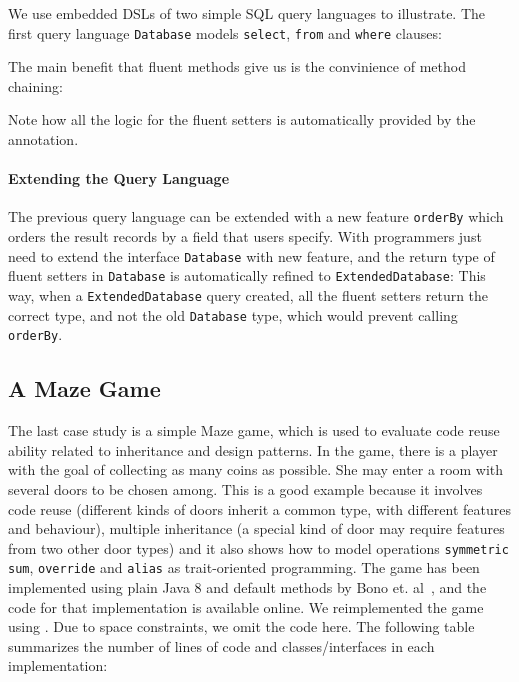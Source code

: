 \noindent We use embedded DSLs of two simple SQL query languages to illustrate.
The first query language \texttt{Database}  models
\texttt{select}, \texttt{from} and \texttt{where} clauses:

\noindent The main benefit that fluent methods give
us is the convinience of method chaining:


\noindent Note how all the logic for the fluent setters is automatically provided by the \mixin annotation. 

\paragraph{Extending the Query Language} The previous query language can be extended with a new feature
\texttt{orderBy} which orders the result records by a field that users
specify. With \mixin programmers just need to extend the interface \texttt{Database} with new
feature, and the return type of fluent setters in
\texttt{Database} is automatically refined to \texttt{ExtendedDatabase}:
This way, when a \texttt{ExtendedDatabase} query created, 
all the fluent setters return the correct type, and not the old \texttt{Database} type, which would prevent calling 
\texttt{orderBy}.


\subsection{A Maze Game}
The last case study is a simple Maze game, which is used
to evaluate code reuse ability related to inheritance and design
patterns. In the game, there is a player with the goal of collecting
as many coins as possible. She may enter a room with several doors to
be chosen among. This is a good example because it involves code reuse
(different kinds of doors inherit a common type, with different
features and behaviour), multiple inheritance (a special kind of door
may require features from two other door types) and it also shows how
to model operations \texttt{symmetric sum}, \texttt{override} and
\texttt{alias} as trait-oriented programming. The game has been
implemented using plain Java 8 and default methods by Bono
et. al~\cite{bono14}, and the code for that implementation is
available online. We reimplemented the game using \mixin. Due to space
constraints, we omit the code here. The following table summarizes
the number of lines of code and classes/interfaces in each implementation:

